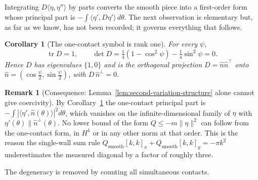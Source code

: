 \documentclass[11pt]{amsart}
\theoremstyle{plain}
\newtheorem{corollary}[theorem]{Corollary}
\theoremstyle{definition}
\newtheorem{remark}[theorem]{Remark}
\begin{document}
Integrating $D\langle\eta,\eta''\rangle$ by parts converts the smooth
piece into a first-order form whose principal part is
$-\int\langle\eta', D\eta'\rangle\,d\theta$.  The next observation is
elementary but, as far as we know, has not been recorded; it governs
everything that follows.

\begin{corollary}[The one-contact symbol is rank one]\label{cor:rank-one}
For every $\psi$,
\begin{equation}\label{eq:detD}
   \operatorname{tr} D = 1,
   \qquad
   \det D = \tfrac14(1-\cos^{2}\psi) - \tfrac14\sin^{2}\psi = 0 .
\end{equation}
Hence $D$ has eigenvalues $\{1,0\}$ and is the orthogonal projection
$D = \hat n\hat n^{\top}$ onto $\hat n = (\cos\tfrac\psi2,
\sin\tfrac\psi2)$, with $D\,\hat n^{\perp} = 0$.
\end{corollary}

\begin{remark}[Consequence: Lemma~\ref{lem:second-variation-structure}
alone cannot give coercivity]\label{rem:rank-one-consequence}
By Corollary~\ref{cor:rank-one} the one-contact principal part is
$-\int|\langle\eta',\hat n(\theta)\rangle|^{2}d\theta$, which vanishes
on the infinite-dimensional family of $\eta$ with
$\eta'(\theta)\parallel\hat n^{\perp}(\theta)$.  No lower bound of the
form $Q\leq-m\|\eta\|^{2}$ can follow from the one-contact form, in
$H^{1}$ or in any other norm at that order.  This is the reason the
single-wall sum rule $Q_{\mathrm{smooth}}[k,k]_{x}+
Q_{\mathrm{smooth}}[k,k]_{y}=-\pi k^{2}$ underestimates the measured
diagonal by a factor of roughly three.
\end{remark}

The degeneracy is removed by counting all simultaneous contacts.
\end{document}
